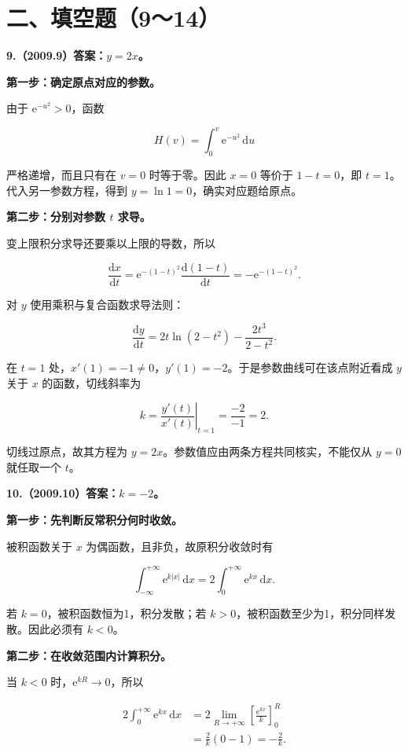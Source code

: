 \documentclass[UTF8,11pt,fontset=windows]{ctexart}
\begin{document}
\clearpage

\section*{二、填空题（9～14）}

\textbf{9.（2009.9）答案：$y=2x$。}

\textbf{第一步：确定原点对应的参数。}

由于 $\mathrm e^{-u^2}>0$，函数

$$
H(v)=\int_0^v\mathrm e^{-u^2}\,\mathrm du
$$

严格递增，而且只有在 $v=0$ 时等于零。因此 $x=0$ 等价于 $1-t=0$，即 $t=1$。代入另一参数方程，得到 $y=\ln1=0$，确实对应题给原点。

\textbf{第二步：分别对参数 $t$ 求导。}

变上限积分求导还要乘以上限的导数，所以

$$
\frac{\mathrm dx}{\mathrm dt}
=\mathrm e^{-(1-t)^2}\frac{\mathrm d(1-t)}{\mathrm dt}
=-\mathrm e^{-(1-t)^2}.
$$

对 $y$ 使用乘积与复合函数求导法则：

$$
\frac{\mathrm dy}{\mathrm dt}
=2t\ln(2-t^2)-\frac{2t^3}{2-t^2}.
$$

在 $t=1$ 处，$x'(1)=-1\ne0$，$y'(1)=-2$。于是参数曲线可在该点附近看成 $y$ 关于 $x$ 的函数，切线斜率为

$$
k=\left.\frac{y'(t)}{x'(t)}\right|_{t=1}
=\frac{-2}{-1}=2.
$$

切线过原点，故其方程为 $\boxed{y=2x}$。参数值应由两条方程共同核实，不能仅从 $y=0$ 就任取一个 $t$。

\clearpage

\textbf{10.（2009.10）答案：$k=-2$。}

\textbf{第一步：先判断反常积分何时收敛。}

被积函数关于 $x$ 为偶函数，且非负，故原积分收敛时有

$$
\int_{-\infty}^{+\infty}\mathrm e^{k|x|}\,\mathrm dx
=2\int_0^{+\infty}\mathrm e^{kx}\,\mathrm dx.
$$

若 $k=0$，被积函数恒为1，积分发散；若 $k>0$，被积函数至少为1，积分同样发散。因此必须有 $k<0$。

\textbf{第二步：在收敛范围内计算积分。}

当 $k<0$ 时，$\mathrm e^{kR}\to0$，所以

$$
\begin{aligned}
2\int_0^{+\infty}\mathrm e^{kx}\,\mathrm dx
&=2\lim_{R\to+\infty}\left[\frac{\mathrm e^{kx}}k\right]_0^R\\
&=\frac2k(0-1)=-\frac2k.
\end{aligned}
$$
\end{document}
